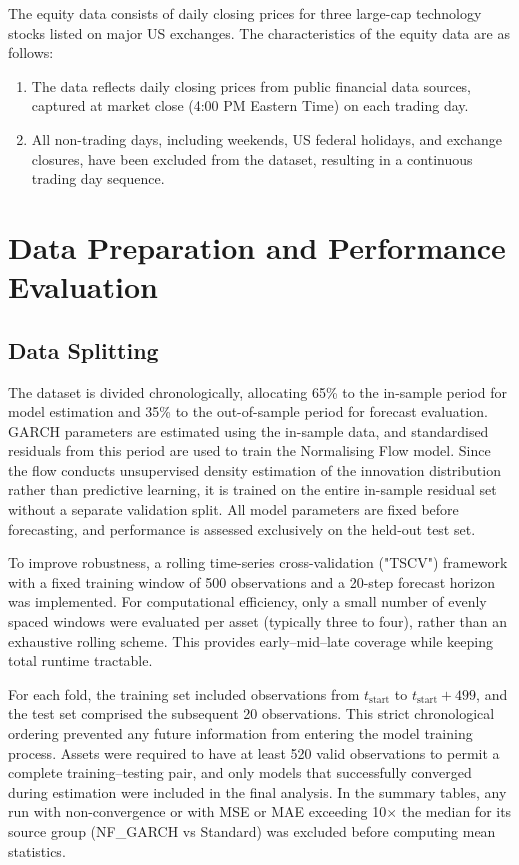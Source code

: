 \documentclass[oneside,12pt]{CUEDthesisPSnPDF}
\begin{document}
The equity data consists of daily closing prices for three large-cap technology stocks listed on major US exchanges. The characteristics of the equity data are as follows:
\begin{enumerate}
    \item The data reflects daily closing prices from public financial data sources, captured at market close (4:00 PM Eastern Time) on each trading day.
    \item All non-trading days, including weekends, US federal holidays, and exchange closures, have been excluded from the dataset, resulting in a continuous trading day sequence.
\end{enumerate}


\section{Data Preparation and Performance Evaluation} 

\subsection{Data Splitting}

\noindent
The dataset is divided chronologically, allocating 65\% to the in-sample period for model estimation and 35\% to the out-of-sample period for forecast evaluation. GARCH parameters are estimated using the in-sample data, and standardised residuals from this period are used to train the Normalising Flow model. Since the flow conducts unsupervised density estimation of the innovation distribution rather than predictive learning, it is trained on the entire in-sample residual set without a separate validation split. All model parameters are fixed before forecasting, and performance is assessed exclusively on the held-out test set.

\medskip
\noindent
To improve robustness, a rolling time-series cross-validation ("TSCV") framework with a fixed training window of 500 observations and a 20-step forecast horizon was implemented. For computational efficiency, only a small number of evenly spaced windows were evaluated per asset (typically three to four), rather than an exhaustive rolling scheme. This provides early–mid–late coverage while keeping total runtime tractable.

\medskip
\noindent
For each fold, the training set included observations from \(t_{\text{start}}\) to \(t_{\text{start}} + 499\), and the test set comprised the subsequent 20 observations. This strict chronological ordering prevented any future information from entering the model training process. Assets were required to have at least 520 valid observations to permit a complete training–testing pair, and only models that successfully converged during estimation were included in the final analysis. In the summary tables, any run with non-convergence or with MSE or MAE exceeding 10$\times$ the median for its source group (NF\_GARCH vs Standard) was excluded before computing mean statistics.
\end{document}
